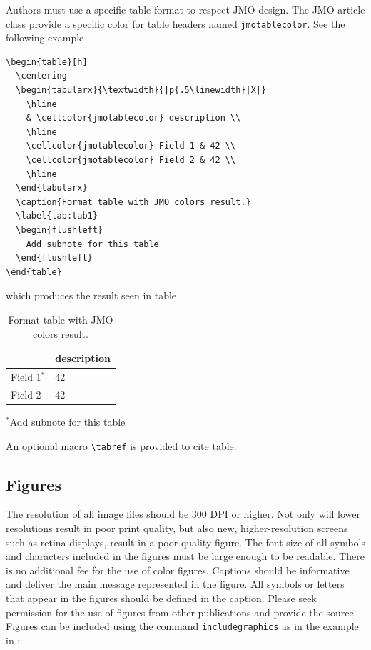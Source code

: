 \documentclass{jmoarticle}
\begin{document}
Authors must use a specific table format to respect JMO design.
The JMO article class provide a specific color for table headers
named \lstinline{jmotablecolor}. See the following example
%
\begin{lstlisting}[style=latex]
\begin{table}[h]
  \centering
  \begin{tabularx}{\textwidth}{|p{.5\linewidth}|X|}
    \hline
    & \cellcolor{jmotablecolor} description \\
    \hline
    \cellcolor{jmotablecolor} Field 1 & 42 \\
    \cellcolor{jmotablecolor} Field 2 & 42 \\
    \hline
  \end{tabularx}
  \caption{Format table with JMO colors result.}
  \label{tab:tab1}
  \begin{flushleft}
    Add subnote for this table
  \end{flushleft}
\end{table}
\end{lstlisting}
which produces the result seen in table .
\begin{table}[h]
  \centering
  \begin{tabularx}{\textwidth}{|p{.5\linewidth}|X|}
    \hline
    & \cellcolor{jmotablecolor} description \\
    \hline
    \cellcolor{jmotablecolor} Field 1$^*$ & 42\\
    \cellcolor{jmotablecolor} Field 2 & 42 \\
    \hline
  \end{tabularx}
  \caption{Format table with JMO colors result.}
  \label{tab:tab1}
  \begin{flushleft}
    $^*$Add subnote for this table
  \end{flushleft}
\end{table}
%
An optional macro \lstinline{\tabref} is provided to cite table.

\subsection{Figures}

The resolution of all image files should be 300 DPI or higher. Not only will
lower resolutions result in poor print quality, but also new, higher-resolution
screens such as retina displays, result in a poor-quality figure. The font size
of all symbols and characters included in the figures must be large enough to
be readable. There is no additional fee for the use of color figures.  Captions
should be informative and deliver the main message represented in the figure.
All symbols or letters that appear in the figures should be defined in the
caption. Please seek permission for the use of figures from other publications
and provide the source. Figures can be included using the command
\texttt{includegraphics} as in the example in :
\end{document}
